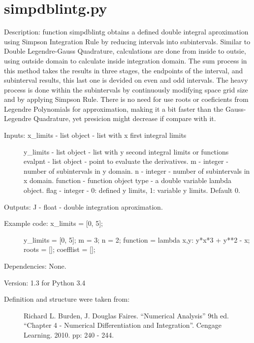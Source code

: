 \documentclass[letterpaper,10pt,oneside]{sphinxmanual}
\theoremstyle{plain}%
\theoremstyle{definition}%
\theoremstyle{remark}%
\begin{document}
\section{simpdblintg.py}
\label{code:module-simpdblintg}\label{code:simpdblintg-py}
Description: function simpdblintg obtains a defined double integral 
aproximation using Simpson Integration Rule by reducing intervals into
subintervals. Similar to Double Legendre-Gauss Quadrature, calculations are
done from inside to outsie, using outside domain to calculate inside 
integration domain. The sum process in this method takes the results in 
three stages, the endpoints of the interval, and subinterval results, this
last one is devided on even and odd intervals. The heavy process is done
within the subintervals by continuously modifying space grid size and by
applying Simpson Rule. There is no need for use roots or coeficients from
Legendre Polynomials for approximation, making it a bit faster than the
Gauss-Legendre Quadrature, yet presicion might decrease if compare with it.
\begin{description}
\item[{Inputs: x\_limits - list object - list with x first integral limits}] \leavevmode
y\_limits - list object - list with y second integral limits or functions
evalpnt - list object - point to evaluate the derivatives.
m - integer - number of subintervals in y domain.
n - integer - number of subintervals in x domain.
function - function object type - a double variable lambda object.
flag - integer - 0: defined y limits, 1: variable y limits. Default 0.

\end{description}

Outputs: J - float - double integration aproximation.
\begin{description}
\item[{Example code: x\_limits = {[}0, 5{]};}] \leavevmode
y\_limits = {[}0, 5{]};
m = 3;
n = 2;
function = lambda x,y: y*x*3 + y**2 - x;
roots = {[}{]};
coefflist = {[}{]};

\end{description}

Dependencies: None.

Version: 1.3 for Python 3.4
\begin{description}
\item[{Definition and structure were taken from:}] \leavevmode
Richard L. Burden, J. Douglas Faires. ``Numerical Analysis'' 9th ed.
``Chapter 4 - Numerical Differentiation and Integration''. 
Cengage Learning. 2010. pp: 240 - 244.

\end{description}
\end{document}
